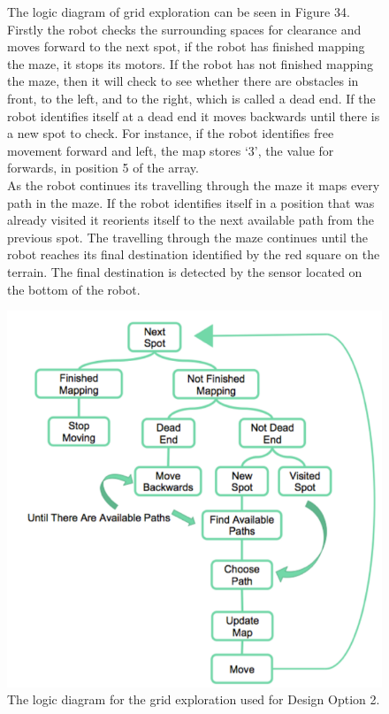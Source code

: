 \documentclass[a4paper]{article}
\begin{document}
\begin{figure}
\begin{minipage}{0.45\textwidth}
The logic diagram of grid exploration can be seen in Figure 34. Firstly the robot checks the surrounding spaces for clearance and moves forward to the next spot, if the robot has finished mapping the maze, it stops its motors. If the robot has not finished mapping the maze, then it will check to see whether there are obstacles in front, to the left, and to the right, which is called a dead end. If the robot identifies itself at a dead end it moves backwards until there is a new spot to check. For instance, if the robot identifies free movement forward and left, the map stores ‘3’, the value for forwards, in position 5 of the array.\\

As the robot continues its travelling through the maze it maps every path in the maze. If the robot identifies itself in a position that was already visited it reorients itself to the next available path from the previous spot. The travelling through the maze continues until the robot reaches its final destination identified by the red square on the terrain. The final destination is detected by the sensor located on the bottom of the robot.
\vspace{0.5cm}
\end{minipage}
\hspace{0.5cm}
\begin{minipage}{0.45\textwidth}
\centering
\includegraphics[scale=0.35]{flow_option2}
\caption{The logic diagram for the grid exploration used for Design Option 2.}
\end{minipage}
\end{figure}
\end{document}
